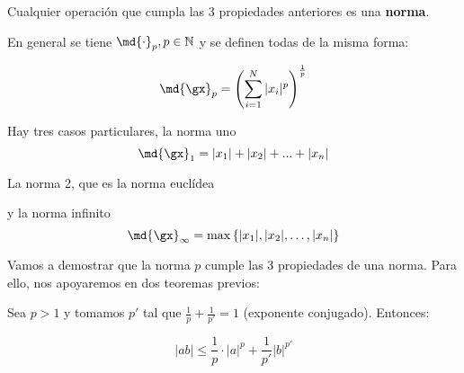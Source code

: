 \documentclass{apuntes}
\begin{document}
\begin{defn}[Norma]
Cualquier operación que cumpla las 3 propiedades anteriores es una \textbf{norma}.

En general se tiene $\md{\cdot}_p, p \in \mathbb{N}$ y se definen todas de la misma forma:

\[ \md{\gx}_p = \left(\sum_{i=1}^N |x_i|^p \right)^\frac{1}{p} \]

\end{defn}

Hay tres casos particulares, la norma uno 
\[ \md{\gx}_1 = |x_1| + |x_2| + ... + |x_n| \]

La norma 2, que es la norma euclídea

y la norma infinito 
\[\md{\gx}_{\infty} = \max\left\{|x_1|,|x_2|,\dots,|x_n|\right\} \]

 Vamos a demostrar que la norma $p$ cumple las 3 propiedades de una norma. Para ello, nos apoyaremos en dos teoremas previos:

\begin{theorem}
 Sea $p > 1$ y tomamos $p'$ tal que $\frac{1}{p}+\frac{1}{p'} = 1$ (exponente conjugado). Entonces:

\[ |ab| \leq \frac{1}{p} \cdot |a|^p +\frac{1}{p'} |b| ^ {p'} \]
\end{theorem}
 
\end{document}
